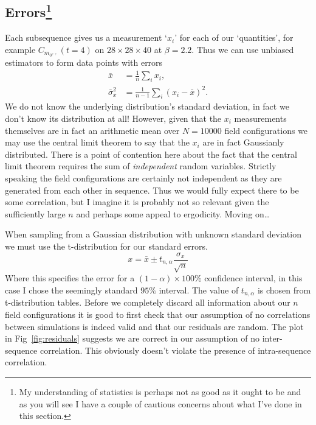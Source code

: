 \documentclass[12pt]{article}
\begin{document}
\subsection{Errors\protect\footnote{My understanding of statistics is perhaps not as good as it ought to be and as you will see I have a couple of cautious concerns about what I've done in this section.}}
Each subsequence gives us a measurement `$x_i$' for each of our `quantities', for example $C_{m_{0^{++}}}(t=4)$ on $28\times 28 \times 40$ at $\beta = 2.2$. Thus we can use unbiased estimators to form data points with errors
\begin{align}
    \bar{x} &= \frac{1}{n}\sum_{i} x_i,\\
    \bar{\sigma}_{x}^2 &= \frac{1}{n-1}\sum_{i} (x_i - \bar{x})^2.
\end{align}
We do not know the underlying distribution's standard deviation, in fact we don't know its distribution at all! However, given that the $x_i$ measurements themselves are in fact an arithmetic mean over $N=10000$ field configurations we may use the central limit theorem to say that the $x_i$ are in fact Gaussianly distributed. There is a point of contention here about the fact that the central limit theorem requires the sum of \emph{independent} random variables. Strictly speaking the field configurations are certainly not independent as they are generated from each other in sequence. Thus we would fully expect there to be some correlation, but I imagine it is probably not so relevant given the sufficiently large $n$ and perhaps some appeal to ergodicity. Moving on\ldots

\par When sampling from a Gaussian distribution with unknown standard deviation we must use the t-distribution for our standard errors.
\begin{equation}
x = \bar{x} \pm t_{n,\alpha} \frac{\sigma_x}{\sqrt{n}}
\end{equation}
Where this specifies the error for a $(1-\alpha)\times100\%$ confidence interval, in this case I chose the seemingly standard $95\%$ interval. The value of $t_{n,\alpha}$ is chosen from t-distribution tables. Before we completely discard all information about our $n$ field configurations it is good to first check that our assumption of no correlations between simulations is indeed valid and that our residuals are random. The plot in Fig~\ref{fig:residuals} suggests we are correct in our assumption of no inter-sequence correlation. This obviously doesn't violate the presence of intra-sequence correlation.
\end{document}

